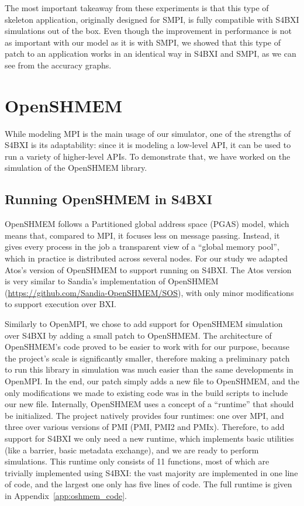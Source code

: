 The most important takeaway from these experiments is that this type of skeleton
application, originally designed for SMPI, is fully compatible with S4BXI
simulations out of the box. Even though the improvement in performance is not as
important with our model as it is with SMPI, we showed that this type of patch
to an application works in an identical way in S4BXI and SMPI, as we can see
from the accuracy graphs.

\section{OpenSHMEM}

While modeling MPI is the main usage of our simulator, one of the strengths of
S4BXI is its adaptability: since it is modeling a low-level API, it can be used
to run a variety of higher-level APIs. To demonstrate that, we have worked on
the simulation of the OpenSHMEM library.

\subsection{Running OpenSHMEM in S4BXI}

OpenSHMEM follows a Partitioned global address space (PGAS) model, which means
that, compared to MPI, it focuses less on message passing. Instead, it gives
every process in the job a transparent view of a ``global memory pool'', which
in practice is distributed across several nodes. For our study we adapted Atos's
version of OpenSHMEM to support running on S4BXI. The Atos version is very
similar to Sandia's implementation of OpenSHMEM
(\url{https://github.com/Sandia-OpenSHMEM/SOS}), with only minor modifications
to support execution over BXI.

Similarly to OpenMPI, we chose to add support for OpenSHMEM simulation over
S4BXI by adding a small patch to OpenSHMEM. The architecture of OpenSHMEM's code
proved to be easier to work with for our purpose, because the project's scale is
significantly smaller, therefore making a preliminary patch to run this library
in simulation was much easier than the same developments in OpenMPI. In the end,
our patch simply adds a new file to OpenSHMEM, and the only modifications we
made to existing code was in the build scripts to include our new file.
Internally, OpenSHMEM uses a concept of a ``runtime'' that should be
initialized. The project natively provides four runtimes: one over MPI, and
three over various versions of PMI (PMI, PMI2 and PMIx). Therefore,  to add
support for S4BXI we only need a new runtime, which implements basic utilities
(like a barrier, basic metadata exchange), and we are ready to perform
simulations. This runtime only consists of 11 functions, most of which are
trivially implemented using S4BXI: the vast majority are implemented in one line
of code, and the largest one only has five lines of code. The full runtime is
given in Appendix~\ref{app:oshmem_code}.

